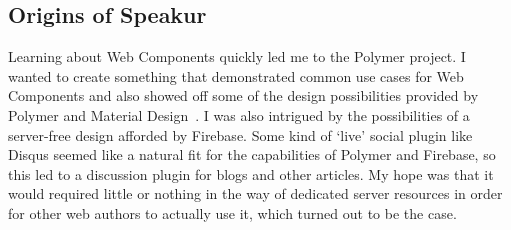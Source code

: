 \subsection{Origins of Speakur}
Learning about Web Components quickly led me to the Polymer project.
I wanted to create something that demonstrated common use cases for Web Components and also showed off some of the design possibilities provided by Polymer and 
Material Design~\cite{imura2015}.
I was also intrigued by the possibilities of a server-free design afforded by Firebase.
Some kind of `live' social plugin like Disqus seemed like a natural fit for the capabilities of Polymer and Firebase, so this led to a discussion plugin for blogs and other articles.
My hope was that it would required little or nothing in the way of dedicated server resources in order for other web authors to actually use it, 
which turned out to be the case. 


